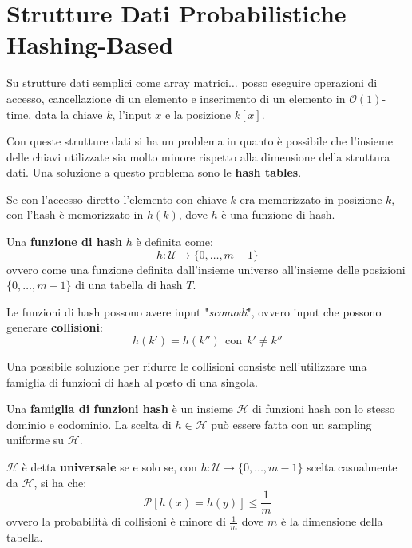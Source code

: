 \chapter{Strutture Dati Probabilistiche Hashing-Based}
Su strutture dati semplici come array matrici$\dots$ posso eseguire operazioni di
accesso, cancellazione di un elemento e inserimento di un elemento in $\mathcal{O}(1)$-time,
data la chiave $k$, l'input $x$ e la posizione $k[x]$.

Con queste strutture dati si ha un problema in quanto è possibile che l'insieme
delle chiavi utilizzate sia molto minore rispetto alla dimensione della struttura dati.
Una soluzione a questo problema sono le \textbf{hash tables}.

Se con l'accesso diretto l'elemento con chiave $k$ era memorizzato in posizione
$k$, con l'hash è memorizzato in $h(k)$, dove $h$ è una funzione di hash.
\begin{definizione}
    Una \textbf{funzione di hash} $h$ è definita come:
    \begin{equation}
        h: \mathcal{U} \to \{0, \dots, m - 1\}
    \end{equation}
    ovvero come una funzione definita dall'insieme universo all'insieme delle
    posizioni $\{0, \dots, m - 1\}$ di una tabella di hash $T$.
\end{definizione}

Le funzioni di hash possono avere input "\textit{scomodi}", ovvero input che possono
generare \textbf{collisioni}:
\begin{equation}
    h(k') = h(k'') \ \ \text{con} \ \ k' \neq k''
\end{equation}

Una possibile soluzione per ridurre le collisioni consiste nell'utilizzare una
famiglia di funzioni di hash al posto di una singola.
\begin{definizione}
    Una \textbf{famiglia di funzioni hash} è un insieme $\mathcal{H}$ di funzioni
    hash con lo stesso dominio e codominio. La scelta di $h \in \mathcal{H}$ può
    essere fatta con un sampling uniforme su $\mathcal{H}$.
\end{definizione}

$\mathcal{H}$ è detta \textbf{universale} se e solo se, con $h : \mathcal{U} \to \{0, \dots, m - 1\}$
scelta casualmente da $\mathcal{H}$, si ha che:
\begin{equation}
    \mathcal{P}[h(x) = h(y)] \leq \frac{1}{m}
\end{equation}
ovvero la probabilità di collisioni è minore di $\frac{1}{m}$ dove $m$ è la
dimensione della tabella.

